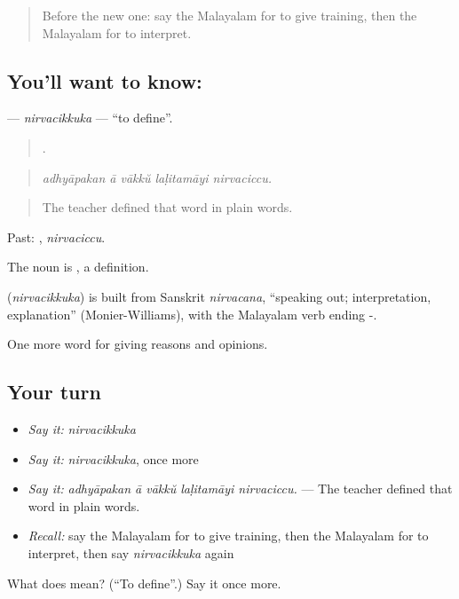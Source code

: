 \label{lesson:ML-C438-nirvacikkuka}



\begin{quote}
Before the new one: say the Malayalam for to give training, then the Malayalam for to interpret.
\end{quote}

\subsection*{You'll want to know: }
\textbf{} — \emph{nirvacikkuka} — \textquotedblleft{}to define\textquotedblright{}.

\begin{quote}
    .
\end{quote}

\begin{quote}
\emph{adhyāpakan ā vākkŭ laḷitamāyi nirvaciccu.}
\end{quote}

\begin{quote}
The teacher defined that word in plain words.
\end{quote}

Past: , \emph{nirvaciccu}.

The noun is , a definition.

\begin{cousinweb}
\textbf{} (\emph{nirvacikkuka}) is built from Sanskrit \emph{nirvacana}, \textquotedblleft{}speaking out; interpretation, explanation\textquotedblright{} (Monier-Williams), with the Malayalam verb ending -.
\end{cousinweb}

\begin{grammarlens}[title={What you've built}]
One more word for giving reasons and opinions.
\end{grammarlens}

\subsection*{Your turn}
\begin{itemize}
\raggedright
  \item \emph{Say it:} \emph{nirvacikkuka}
  \item \emph{Say it:} \emph{nirvacikkuka}, once more
  \item \emph{Say it:} \emph{adhyāpakan ā vākkŭ laḷitamāyi nirvaciccu.} — The teacher defined that word in plain words.
  \item \emph{Recall:} say the Malayalam for to give training, then the Malayalam for to interpret, then say \emph{nirvacikkuka} again
\end{itemize}

\begin{tcolorbox}[breakable,colback=teal!4,colframe=teal!35!black,title={Before you move on}]
What does  mean? (\textquotedblleft{}To define\textquotedblright{}.) Say it once more.
\end{tcolorbox}
